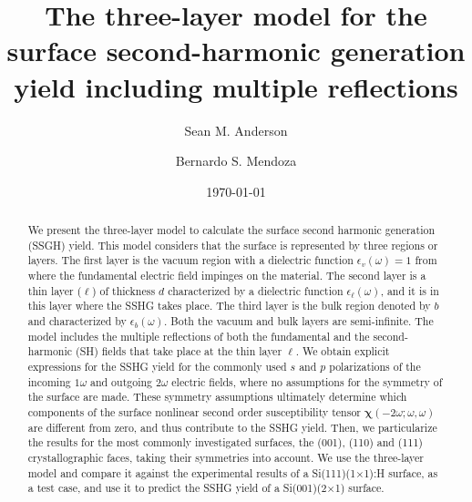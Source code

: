 \documentclass[aps,prb,10pt,showpacs,letterpaper,twocolumn]{revtex4-1}
\begin{document}
\title{The three-layer model for the surface second-harmonic generation yield
including multiple reflections}
\author{Sean M. Anderson}
\author{Bernardo S. Mendoza}
\date{\today}

\begin{abstract}
We present the three-layer model to calculate the surface second harmonic
generation (SSGH) yield. This model considers that the surface is represented by
three regions or layers. The first layer is the vacuum region with a dielectric
function $\epsilon_{v}(\omega)=1$ from where the fundamental electric field
impinges on the material. The second layer is a thin layer ($\ell$) of thickness
$d$ characterized by a dielectric function $\epsilon_{\ell}(\omega)$, and it is
in this layer where the SSHG takes place. The third layer is the bulk region
denoted by $b$ and characterized by $\epsilon_{b}(\omega)$. Both the vacuum and
bulk layers are semi-infinite. The model includes the multiple reflections of
both the fundamental and the second-harmonic (SH) fields that take place at the
thin layer $\ell$. We obtain explicit expressions for the SSHG yield for the
commonly used $s$ and $p$ polarizations of the incoming $1\omega$ and outgoing
$2\omega$ electric fields, where no assumptions for the symmetry of the surface
are made. These symmetry assumptions ultimately determine which components of
the surface nonlinear second order susceptibility tensor
$\boldsymbol{\chi}(-2\omega;\omega,\omega)$ are different from zero, and thus
contribute to the SSHG yield. Then, we particularize the results for  the most
commonly investigated surfaces, the (001), (110) and (111) crystallographic
faces, taking their symmetries into account. We use the three-layer model and
compare it against the experimental results of a Si(111)(1$\times$1):H surface,
as a test case, and use it to predict the SSHG yield of a Si(001)(2$\times$1)
surface.
\end{abstract}


\maketitle

\end{document}
